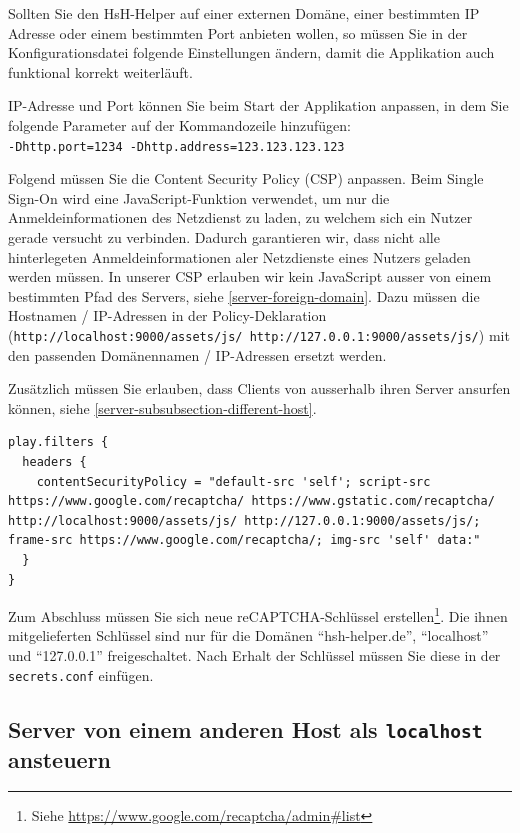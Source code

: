 \documentclass[12pt,DIV14,BCOR10mm,a4paper,parskip=half-,headsepline,headinclude,english,ngerman,bibliography=totocnumbered]{scrreprt}
\begin{document}
Sollten Sie den HsH-Helper auf einer externen Domäne, einer bestimmten IP Adresse oder einem bestimmten Port anbieten wollen, so müssen Sie in der Konfigurationsdatei folgende Einstellungen ändern, damit die Applikation auch funktional korrekt weiterläuft.

IP-Adresse und Port können Sie beim Start der Applikation anpassen, in dem Sie folgende Parameter auf der Kommandozeile hinzufügen: \\
\texttt{-Dhttp.port=1234 -Dhttp.address=123.123.123.123}

Folgend müssen Sie die Content Security Policy (CSP) anpassen.\label{server-adjust-csp}
Beim Single Sign-On wird eine JavaScript-Funktion verwendet, um nur die Anmeldeinformationen des Netzdienst zu laden, zu welchem sich ein Nutzer gerade versucht zu verbinden.
Dadurch garantieren wir, dass nicht alle hinterlegeten Anmeldeinformationen aler Netzdienste eines Nutzers geladen werden müssen.
In unserer CSP erlauben wir kein JavaScript ausser von einem bestimmten Pfad des Servers, siehe \autoref{server-foreign-domain}.
Dazu müssen die Hostnamen / IP-Adressen in der Policy-Deklaration (\texttt{http://localhost:9000/assets/js/ http://127.0.0.1:9000/assets/js/}) mit den passenden Domänennamen / IP-Adressen ersetzt werden.

Zusätzlich müssen Sie erlauben, dass Clients von ausserhalb ihren Server ansurfen können, siehe \autoref{server-subsubsection-different-host}.

\begin{lstlisting}[label=server-foreign-domain, caption={"Content Security Header"-Einstellung innerhalb der Konfigurationsdatei}, captionpos=b]
play.filters {
  headers {
    contentSecurityPolicy = "default-src 'self'; script-src https://www.google.com/recaptcha/ https://www.gstatic.com/recaptcha/ http://localhost:9000/assets/js/ http://127.0.0.1:9000/assets/js/; frame-src https://www.google.com/recaptcha/; img-src 'self' data:"
  }
}
\end{lstlisting}

Zum Abschluss müssen Sie sich neue reCAPTCHA-Schlüssel erstellen\footnote{Siehe \url{https://www.google.com/recaptcha/admin\#list}}.
Die ihnen mitgelieferten Schlüssel sind nur für die Domänen \enquote{hsh-helper.de}, \enquote{localhost} und \enquote{127.0.0.1} freigeschaltet.
Nach Erhalt der Schlüssel müssen Sie diese in der \texttt{secrets.conf} einfügen.

\subsection{Server von einem anderen Host als \texttt{localhost} ansteuern}
\label{server-subsubsection-different-host}
\end{document}
